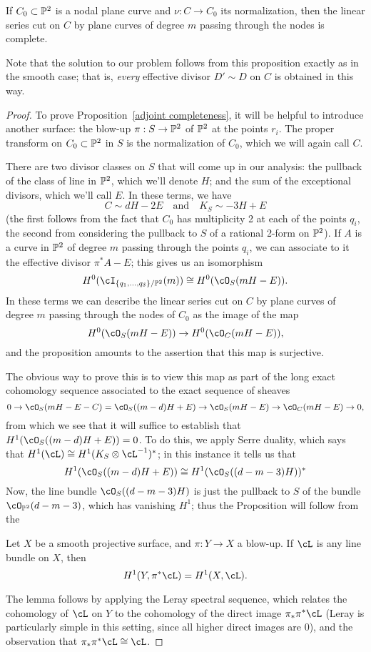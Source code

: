 \begin{proposition}\label{adjoint completeness}
If $C_0 \subset \PP^2$ is a nodal plane curve and $\nu : C \to C_0$ its normalization, then the linear series cut on $C$ by plane curves of degree $m$ passing through the nodes is complete.
\end{proposition}

Note  that the solution to our problem follows from this proposition exactly as in the smooth case; that is, \emph{every} effective divisor $D' \sim D$ on $C$ is obtained in this way.

\begin{proof}
To prove Proposition~\ref{adjoint completeness}, it will be helpful to introduce another surface: the blow-up $\pi : S \to \PP^2$ of $\PP^2$ at the points $r_i$. The proper transform on $C_0 \subset \PP^2$ in $S$ is the normalization of $C_0$, which we will again call $C$.

There are two divisor classes on $S$ that will come up in our analysis: the pullback of the class of line in $\PP^2$, which we'll denote $H$; and the sum of the exceptional divisors, which we'll call $E$. In these terms, we have
$$
C \sim dH - 2E \quad \text{and} \quad K_S \sim -3H + E
$$
(the first follows from the fact that $C_0$ has multiplicity 2 at each of the points $q_i$, the second from considering the pullback to $S$ of a rational 2-form on $\PP^2$). If $A$ is a curve in $\PP^2$ of degree $m$ passing through the points $q_i$, we can associate to it the effective divisor $\pi^*A - E$; this gives us an isomorphism
$$
H^0(\cI_{\{q_1,\dots,q_\delta\}/\PP^2}(m)) \cong H^0(\cO_S(mH-E)).
$$
In these terms we can describe the linear series cut on $C$ by plane curves of degree $m$ passing through the nodes of $C_0$ as the image of the map
$$
H^0(\cO_S(mH-E)) \to H^0(\cO_C(mH-E)),
$$
and the proposition amounts to the assertion that this map is surjective.

The obvious way to prove this is to view this map as part of the long exact cohomology sequence associated to the exact sequence of sheaves
$$
0 \to \cO_S(mH-E-C) = \cO_S((m-d)H + E)  \to \cO_S(mH-E) \to \cO_C(mH-E) \to 0,
$$
from which we see that it will suffice to establish that $H^1(\cO_S((m-d)H + E)) = 0$. To do this, we apply Serre duality, which says that $H^1(\cL) \cong H^1(K_S\otimes \cL^{-1})^*$; in this instance it 
tells us that
$$
H^1(\cO_S((m-d)H + E)) \cong H^1(\cO_S((d-m-3)H))^*
$$
Now, the line bundle $\cO_S((d-m-3)H)$ is just the pullback to $S$ of the bundle $\cO_{\PP^2}(d-m-3)$, which has vanishing $H^1$; thus the Proposition will follow from the 
\begin{lemma}
Let $X$ be a smooth projective surface, and $\pi : Y \to X$ a blow-up. If $\cL$ is any line bundle on $X$, then
$$
H^1(Y, \pi^*\cL) = H^1(X, \cL).
$$
\end{lemma}
The lemma follows by applying the Leray spectral sequence, which relates the cohomology of $\cL$ on $Y$ to the cohomology of the direct image $\pi_*\pi^*\cL$ (Leray is particularly simple in this setting, since all higher direct images are 0), and the observation that $\pi_*\pi^*\cL \cong \cL$.
\end{proof}


